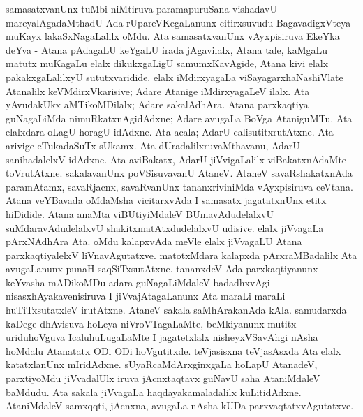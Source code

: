 samasatxvanUnx tuMbi niMtiruva paramapuruSana vishadavU mareyalAgadaMthadU Ada rUpareVKegaLanunx citirxsuvudu BagavadigxVteya muKayx lakaSxNagaLalilx oMdu. Ata samasatxvanUnx vAyxpisiruva EkeYka deYva - Atana pAdagaLU keYgaLU irada jAgavilalx, Atana tale, kaMgaLu matutx muKagaLu elalx dikukxgaLigU samumxKavAgide, Atana kivi elalx pakakxgaLalilxyU sututxvaridide. elalx iMdirxyagaLa viSayagarxhaNashiVlate Atanalilx keVMdirxVkarisive; Adare Atanige iMdirxyagaLeV ilalx. Ata yAvudakUkx aMTikoMDilalx; Adare sakalAdhAra. Atana parxkaqtiya guNagaLiMda nimuRkatxnAgidAdxne; Adare avugaLa BoVga AtaniguMTu. Ata elalxdara oLagU horagU idAdxne. Ata acala; AdarU calisutitxrutAtxne. Ata arivige eTukadaSuTx sUkamx. Ata dUradalilxruvaMthavanu, AdarU sanihadalelxV idAdxne. Ata aviBakatx, AdarU jiVvigaLalilx viBakatxnAdaMte toVrutAtxne. sakalavanUnx poVSisuvavanU AtaneV. AtaneV savaRshakatxnAda paramAtamx, savaRjacnx, savaRvanUnx tananxriviniMda vAyxpisiruva ceVtana. Atana veYBavada oMdaMsha vicitarxvAda I samasatx jagatatxnUnx etitx hiDidide. Atana anaMta viBUtiyiMdaleV BUmavAdudelalxvU suMdaravAdudelalxvU shakitxmatAtxdudelalxvU udisive. elalx jiVvagaLa pArxNAdhAra Ata. oMdu kalapxvAda meVle elalx jiVvagaLU Atana parxkaqtiyalelxV liVnavAgutatxve. matotxMdara kalapxda pArxraMBadalilx Ata avugaLanunx punaH saqSiTxsutAtxne. tananxdeV Ada parxkaqtiyanunx keYvasha mADikoMDu adara guNagaLiMdaleV badadhxvAgi nisasxhAyakavenisiruva I jiVvajAtagaLanunx Ata maraLi maraLi huTiTxsutatxleV irutAtxne. AtaneV sakala saMhArakanAda kAla. samudarxda kaDege dhAvisuva hoLeya niVroVTagaLaMte, beMkiyanunx mutitx uriduhoVguva IcaluhuLugaLaMte I jagatetxlalx nisheyxVSavAhgi nAsha hoMdalu Atanatatx ODi ODi hoVgutitxde. teVjasisxna teVjasAsxda Ata elalx katatxlanUnx mIridAdxne. sUyaRcaMdArxginxgaLa hoLapU AtanadeV, parxtiyoMdu jiVvadalUlx iruva jAcnxtaqtavx guNavU saha AtaniMdaleV baMdudu. Ata sakala jiVvagaLa haqdayakamaladalilx kuLitidAdxne. AtaniMdaleV samxqqti, jAcnxna, avugaLa nAsha kUDa parxvaqtatxvAgutatxve.

